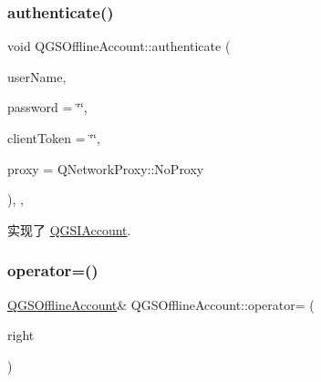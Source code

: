 \subsubsection{\texorpdfstring{authenticate()}{authenticate()}}
{\footnotesize\ttfamily void Q\+G\+S\+Offline\+Account\+::authenticate (\begin{DoxyParamCaption}\item[{const Q\+String \&}]{user\+Name,  }\item[{const Q\+String \&}]{password = {\ttfamily \char`\"{}\char`\"{}},  }\item[{Q\+String}]{client\+Token = {\ttfamily \char`\"{}\char`\"{}},  }\item[{Q\+Network\+Proxy}]{proxy = {\ttfamily QNetworkProxy\+:\+:NoProxy} }\end{DoxyParamCaption})\hspace{0.3cm}{\ttfamily [override]}, {\ttfamily [virtual]}, {\ttfamily [noexcept]}}



实现了 \mbox{\hyperlink{class_q_g_s_i_account_ad10a95dcbe8f6071d63ecfdf60f40609}{Q\+G\+S\+I\+Account}}.

\mbox{\label{class_q_g_s_offline_account_a8b6b6305d28cef593559775bf78c69a8}} 
\subsubsection{\texorpdfstring{operator=()}{operator=()}\hspace{0.1cm}{\footnotesize\ttfamily [1/2]}}
{\footnotesize\ttfamily \mbox{\hyperlink{class_q_g_s_offline_account}{Q\+G\+S\+Offline\+Account}}\& Q\+G\+S\+Offline\+Account\+::operator= (\begin{DoxyParamCaption}\item[{const \mbox{\hyperlink{class_q_g_s_offline_account}{Q\+G\+S\+Offline\+Account}} \&}]{right }\end{DoxyParamCaption})\hspace{0.3cm}{\ttfamily [default]}}

\mbox{\label{class_q_g_s_offline_account_a45d2f3e16b18dc8700fe7afbf494d26f}} 
